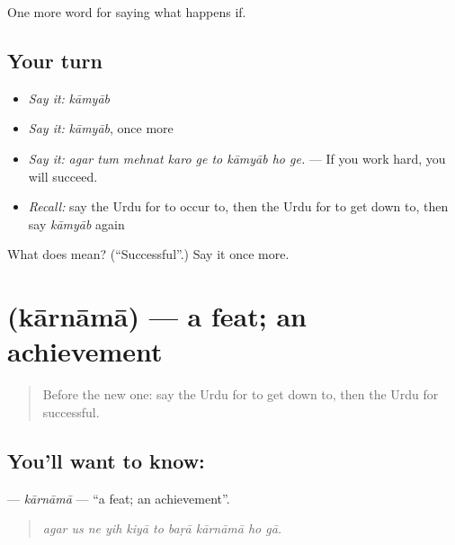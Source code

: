 \begin{grammarlens}[title={What you've built}]
One more word for saying what happens if.
\end{grammarlens}

\subsection*{Your turn}
\begin{itemize}
\raggedright
  \item \emph{Say it:} \emph{kāmyāb}
  \item \emph{Say it:} \emph{kāmyāb}, once more
  \item \emph{Say it:} \emph{agar tum mehnat karo ge to kāmyāb ho ge.} — If you work hard, you will succeed.
  \item \emph{Recall:} say the Urdu for to occur to, then the Urdu for to get down to, then say \emph{kāmyāb} again
\end{itemize}

\begin{tcolorbox}[breakable,colback=teal!4,colframe=teal!35!black,title={Before you move on}]
What does  mean? (\textquotedblleft{}Successful\textquotedblright{}.) Say it once more.
\end{tcolorbox}
\section[\texorpdfstring{\ur{کارنامہ} (kārnāmā)}{کارنامہ (kārnāmā)}]{ (kārnāmā) — a feat; an achievement}

\label{lesson:UR-C381-karnama}



\begin{quote}
Before the new one: say the Urdu for to get down to, then the Urdu for successful.
\end{quote}

\subsection*{You'll want to know: }
\textbf{} — \emph{kārnāmā} — \textquotedblleft{}a feat; an achievement\textquotedblright{}.

\begin{quote}
         
\end{quote}

\begin{quote}
\emph{agar us ne yih kiyā to baṛā kārnāmā ho gā.}
\end{quote}

